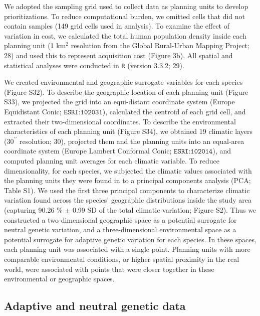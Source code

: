 \documentclass[9pt,twocolumn,twoside,lineno]{pnas-new}
\begin{document}
We adopted the sampling grid used to collect data as planning units to
develop prioritizations. To reduce computational burden, we omitted
cells that did not contain samples (149 grid cells used in analysis). To
examine the effect of variation in cost, we calculated the total human
population density inside each planning unit (1 km\(^2\) resolution from
the Global Rural-Urban Mapping Project; 28) and used this to represent
acquisition cost (Figure 3b). All spatial and statistical analyses were
conducted in \texttt{R} (version 3.3.2; 29).

We created environmental and geographic surrogate variables for each
species (Figure S32). To describe the geographic location of each
planning unit (Figure S33), we projected the grid into an equi-distant
coordinate system (Europe Equidistant Conic; \(\texttt{ESRI:102031}\)),
calculated the centroid of each grid cell, and extracted their
two-dimensional coordinates. To describe the environmental
characteristics of each planning unit (Figure S34), we obtained 19
climatic layers (\(30^{\prime\prime}\) resolution; 30), projected them
and the planning units into an equal-area coordinate system (Europe
Lambert Conformal Conic; \(\texttt{ESRI:102014}\)), and computed
planning unit averages for each climatic variable. To reduce
dimensionality, for each species, we subjected the climatic values
associated with the planning units they were found in to a principal
components analysis (PCA; Table S1). We used the first three principal
components to characterize climatic variation found across the species'
geographic distributions inside the study area (capturing 90.26 \%
\(\pm\) 0.99 SD of the total climatic variation; Figure S2). Thus we
constructed a two-dimensional geographic space as a potential surrogate
for neutral genetic variation, and a three-dimensional environmental
space as a potential surrogate for adaptive genetic variation for each
species. In these spaces, each planning unit was associated with a
single point. Planning units with more comparable environmental
conditions, or higher spatial proximity in the real world, were
associated with points that were closer together in these environmental
or geographic spaces.

\subsection*{Adaptive and neutral genetic
data}\label{adaptive-and-neutral-genetic-data}
\end{document}
